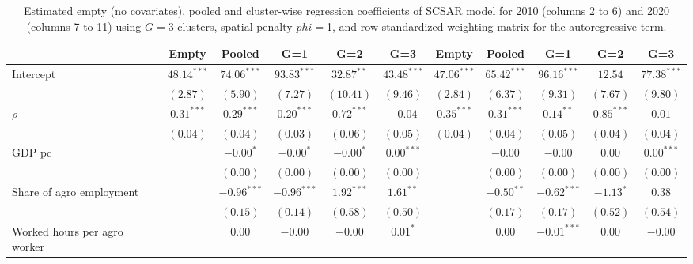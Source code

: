 
\begin{table}
\caption{Estimated empty (no covariates), pooled and cluster-wise regression coefficients of SCSAR model for 2010 (columns 2 to 6) and 2020 (columns 7 to 11) using $G=$3 clusters, spatial penalty $phi=$1, and row-standardized weighting matrix for the autoregressive term.}
\begin{center}
\begin{tabular}{l c c c c c c c c c c}
\hline
 & Empty & Pooled & G=1 & G=2 & G=3 & Empty & Pooled & G=1 & G=2 & G=3 \\
\hline
Intercept                         & $48.14^{***}$ & $74.06^{***}$ & $93.83^{***}$ & $32.87^{**}$ & $43.48^{***}$ & $47.06^{***}$ & $65.42^{***}$ & $96.16^{***}$ & $12.54$      & $77.38^{***}$ \\
                                  & $(2.87)$      & $(5.90)$      & $(7.27)$      & $(10.41)$    & $(9.46)$      & $(2.84)$      & $(6.37)$      & $(9.31)$      & $(7.67)$     & $(9.80)$      \\
$\rho$                            & $0.31^{***}$  & $0.29^{***}$  & $0.20^{***}$  & $0.72^{***}$ & $-0.04$       & $0.35^{***}$  & $0.31^{***}$  & $0.14^{**}$   & $0.85^{***}$ & $0.01$        \\
                                  & $(0.04)$      & $(0.04)$      & $(0.03)$      & $(0.06)$     & $(0.05)$      & $(0.04)$      & $(0.04)$      & $(0.05)$      & $(0.04)$     & $(0.04)$      \\
GDP pc                            &               & $-0.00^{*}$   & $-0.00^{*}$   & $-0.00^{*}$  & $0.00^{***}$  &               & $-0.00$       & $-0.00$       & $0.00$       & $0.00^{***}$  \\
                                  &               & $(0.00)$      & $(0.00)$      & $(0.00)$     & $(0.00)$      &               & $(0.00)$      & $(0.00)$      & $(0.00)$     & $(0.00)$      \\
Share of agro employment          &               & $-0.96^{***}$ & $-0.96^{***}$ & $1.92^{***}$ & $1.61^{**}$   &               & $-0.50^{**}$  & $-0.62^{***}$ & $-1.13^{*}$  & $0.38$        \\
                                  &               & $(0.15)$      & $(0.14)$      & $(0.58)$     & $(0.50)$      &               & $(0.17)$      & $(0.17)$      & $(0.52)$     & $(0.54)$      \\
Worked hours per agro worker      &               & $0.00$        & $-0.00$       & $-0.00$      & $0.01^{*}$    &               & $0.00$        & $-0.01^{***}$ & $0.00$       & $-0.00$       \\

\end{tabular}
\end{center}
\end{table}
